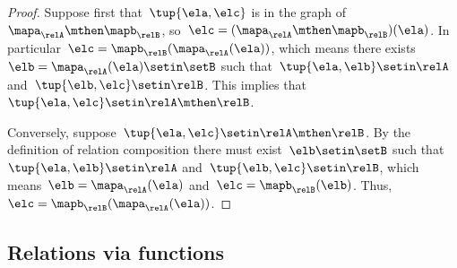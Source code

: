 \begin{proof}
    Suppose first that~$\tup{\ela, \elc}$ is in the graph of~$\mapa_\relA \mthen \mapb_\relB$, so~$\elc = (\mapa_\relA \mthen \mapb_\relB)(\ela)$.
    In particular~$\elc =  \mapb_\relB(\mapa_\relA(\ela))$, which means there exists~$\elb = \mapa_\relA(\ela) \setin \setB$ such that~$\tup{\ela, \elb} \setin \relA$ and~$\tup{\elb, \elc} \setin \relB$.
    This implies that~$\tup{\ela, \elc} \setin \relA \mthen \relB$.

    Conversely, suppose~$\tup{\ela, \elc} \setin \relA \mthen \relB$.
    By the definition of relation composition there must exist~$\elb \setin \setB$ such that~$\tup{\ela, \elb} \setin \relA$ and~$\tup{\elb, \elc} \setin \relB$, which means~$\elb = \mapa_\relA(\ela)$ and~$\elc = \mapb_\relB(\elb)$.
    Thus,~$\elc = \mapb_\relB(\mapa_\relA(\ela))$.
\end{proof}

\subsection{Relations via functions}

